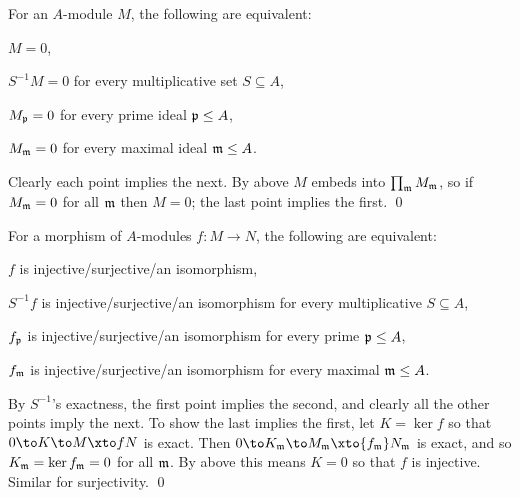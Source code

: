 \eproof

\bcoro

    For an $A$-module $M$, the following are equivalent:
    \benum
        \item $M=0$,
        \item $S^{-1}M=0$ for every multiplicative set $S\subseteq A$,
        \item $M_{{\frak p}}=0$ for every prime ideal ${{\frak p}}\leq A$,
        \item $M_{{\frak m}}=0$ for every maximal ideal ${{\frak m}}\leq A$.
    \eenum

\ecoro

\bproof

    Clearly each point implies the next.
    By above $M$ embeds into $\prod_{{\frak m}} M_{{\frak m}}$, so if $M_{{\frak m}}=0$ for all ${{\frak m}}$ then $M=0$; the last point implies the first.
    \qed

\eproof

\bcoro

    For a morphism of $A$-modules $f\colon M\to N$, the following are equivalent:
    \benum
        \item $f$ is injective/surjective/an isomorphism,
        \item $S^{-1}f$ is injective/surjective/an isomorphism for every multiplicative $S\subseteq A$,
        \item $f_{{\frak p}}$ is injective/surjective/an isomorphism for every prime ${{\frak p}}\leq A$,
        \item $f_{{\frak m}}$ is injective/surjective/an isomorphism for every maximal ${{\frak m}}\leq A$.
    \eenum

\ecoro

\bproof

    By $S^{-1}$'s exactness, the first point implies the second, and clearly all the other points imply the next.
    To show the last implies the first, let $K=\ker f$ so that $0\to K\to M\xto fN$ is exact.
    Then $0\to K_\m\to M_\m\xto{f_\m}N_\m$ is exact, and so $K_{{\frak m}}=\mathop{\rm ker} f_{{\frak m}}=0$ for all ${{\frak m}}$.
    By above this means $K=0$ so that $f$ is injective.
    Similar for surjectivity.
    \qed

\eproof

